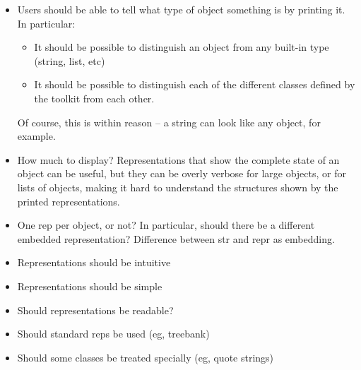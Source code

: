 \documentclass[11pt]{article}
\begin{document}
\begin{itemize}

  \item Users should be able to tell what type of object something is
    by printing it.  In particular:
    \begin{itemize}
      \item It should be possible to distinguish an object from any
        built-in type (string, list, etc)
      \item It should be possible to distinguish each of the different
        classes defined by the toolkit from each other.
    \end{itemize}

    Of course, this is within reason -- a string can look like any
    object, for example.

  \item How much to display?  Representations that show the complete
  state of an object can be useful, but they can be overly verbose for
  large objects, or for lists of objects, making it hard to understand
  the structures shown by the printed representations.

  \item One rep per object, or not?  In particular, should there be a
  different embedded representation?  Difference between str and repr
  as embedding.

  \item Representations should be intuitive

  \item Representations should be simple

  \item Should representations be readable?

  \item Should standard reps be used (eg, treebank)

  \item Should some classes be treated specially (eg, quote strings)

\end{itemize}
\end{document}
